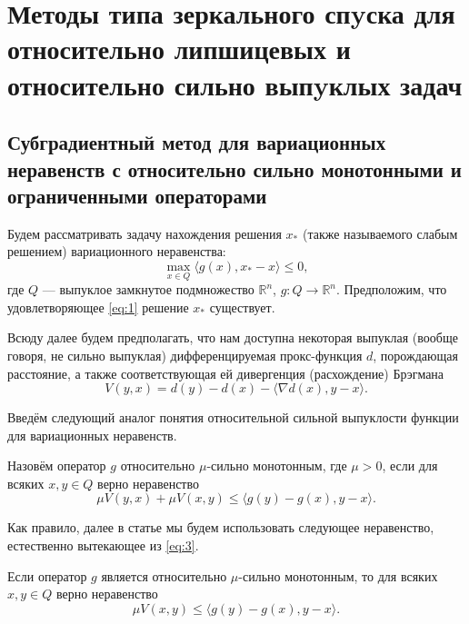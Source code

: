 \chapter{Методы типа зеркального спyска для относительно липшицевых и относительно сильно выпyклых задач}\label{ch:ch1}

\section{Субградиентный метод для вариационных неравенств с относительно сильно монотонными и ограниченными операторами}\label{section_2}

Будем рассматривать задачу нахождения решения $x_*$ (также называемого слабым решением) вариационного неравенства: 
\begin{equation}\label{eq:1}
\max_{x \in Q} \langle g(x), x_* - x \rangle \leq 0,
\end{equation}
где $Q$ --- выпуклое замкнутое подмножество $\mathbb{R}^n$,
$g: Q \longrightarrow \mathbb{R}^n$. Предположим, что удовлетворяющее \eqref{eq:1} решение $x_*$ существует.

Всюду далее будем предполагать, что нам доступна некоторая выпуклая (вообще говоря, не сильно выпуклая) дифференцируемая прокс-функция $d$, порождающая расстояние, а также соответствующая ей дивергенция (расхождение) Брэгмана \cite{Bauschke}
$$
V(y, x) = d(y) - d(x) - \langle \nabla d(x), y - x \rangle.
$$

Введём следующий аналог понятия относительной сильной выпуклости функции \cite{Lu_Nesterov_2018} для вариационных неравенств.
\begin{definition}\label{DefRelStrongMonot}
Назовём оператор $g$ относительно $\mu$-сильно монотонным, где $\mu >0$, если для всяких $x, y \in Q$ верно неравенство
	\begin{equation}\label{eq:3}
	 	\mu V(y, x) + \mu V(x, y) \leq \langle g(y) - g(x), y - x \rangle.
	 \end{equation}
\end{definition}
Как правило, далее в статье мы будем использовать следующее неравенство, естественно вытекающее из \eqref{eq:3}.
\begin{remark}
Если оператор $g$ является  относительно $\mu$-сильно монотонным, то для всяких $x, y \in Q$ верно неравенство
	\begin{equation}\label{cr:4}
	 	\mu V(x, y) \leq \langle g(y) - g(x), y - x \rangle.
	 \end{equation}
\end{remark}

